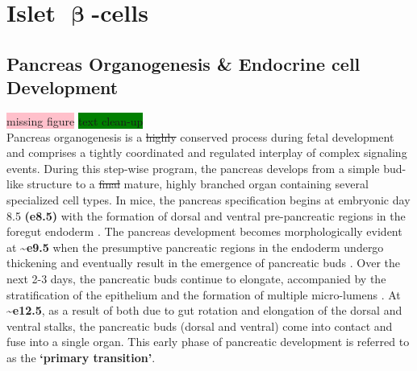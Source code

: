 \newpage


\section{ Islet \( \mathbf{\upbeta} \)-cells}  %
\label{sec:human_ipscs}  

\subsection{Pancreas Organogenesis \& Endocrine cell Development} %
\label{sec:pancorganoendodev}

\colorbox{pink}{missing figure} \colorbox{green}{text clean-up}\\

Pancreas organogenesis is a \st{highly} conserved process during fetal development and comprises a tightly coordinated and regulated interplay of complex signaling events. During this step-wise program, the pancreas develops from a simple bud-like structure to a \st{final} mature, highly branched organ containing several specialized cell types. In mice, the pancreas specification begins at embryonic day 8.5 \textbf{(e8.5)} with the formation of dorsal and ventral pre-pancreatic regions in the foregut endoderm \textbf{\cite{shih_pancreas_2013, slack_developmental_1995}}. The pancreas development becomes morphologically evident at  \textbf{\textasciitilde e9.5} when the presumptive pancreatic regions in the endoderm undergo thickening and eventually result in the emergence of pancreatic buds \textbf{\cite{shih_pancreas_2013}}. Over the next 2-3 days, the pancreatic buds continue to elongate, accompanied by the stratification of the epithelium and the formation of multiple micro-lumens \textbf{\cite{pan_pancreas_2011}}. At \textbf{\textasciitilde e12.5}, as a result of both due to gut rotation and elongation of the dorsal and ventral stalks, the pancreatic buds (dorsal and ventral) come into contact and fuse into a single organ. This early phase of pancreatic development is referred to as the \textbf{`primary transition'}.\\


